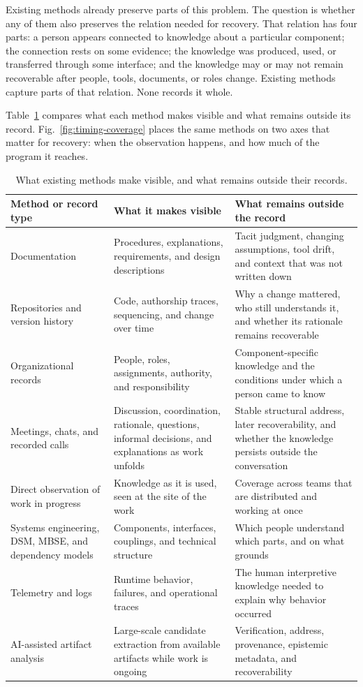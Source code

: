 \documentclass[preprints,article,submit,moreauthors]{Definitions/mdpi}
\begin{document}
Existing methods already preserve parts of this problem. The question is whether any of them also preserves the relation needed for recovery. That relation has four parts: a person appears connected to knowledge about a particular component; the connection rests on some evidence; the knowledge was produced, used, or transferred through some interface; and the knowledge may or may not remain recoverable after people, tools, documents, or roles change. Existing methods capture parts of that relation. None records it whole.

Table~\ref{tab:methods} compares what each method makes visible and what remains outside its record. Fig.~\ref{fig:timing-coverage} places the same methods on two axes that matter for recovery: when the observation happens, and how much of the program it reaches.

\begin{table}[H]
\caption{What existing methods make visible, and what remains outside their records.}
\label{tab:methods}
\centering
\scriptsize
\begin{tabularx}{\textwidth}{XXX}
\hline
\textbf{Method or record type} & \textbf{What it makes visible} & \textbf{What remains outside the record} \\
\hline
Documentation & Procedures, explanations, requirements, and design descriptions & Tacit judgment, changing assumptions, tool drift, and context that was not written down \\
Repositories and version history & Code, authorship traces, sequencing, and change over time & Why a change mattered, who still understands it, and whether its rationale remains recoverable \\
Organizational records & People, roles, assignments, authority, and responsibility & Component-specific knowledge and the conditions under which a person came to know \\
Meetings, chats, and recorded calls & Discussion, coordination, rationale, questions, informal decisions, and explanations as work unfolds & Stable structural address, later recoverability, and whether the knowledge persists outside the conversation \\
Direct observation of work in progress & Knowledge as it is used, seen at the site of the work & Coverage across teams that are distributed and working at once \\
Systems engineering, DSM, MBSE, and dependency models & Components, interfaces, couplings, and technical structure & Which people understand which parts, and on what grounds \\
Telemetry and logs & Runtime behavior, failures, and operational traces & The human interpretive knowledge needed to explain why behavior occurred \\
AI-assisted artifact analysis & Large-scale candidate extraction from available artifacts while work is ongoing & Verification, address, provenance, epistemic metadata, and recoverability \\
\hline
\end{tabularx}
\end{table}
\end{document}
